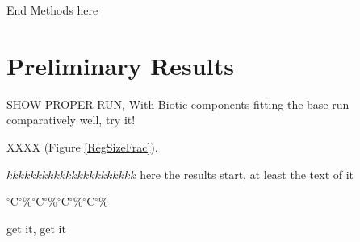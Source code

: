 End Methods here

\section{Preliminary Results}


SHOW PROPER RUN, With Biotic components fitting the base run comparatively well, try it!

XXXX (Figure \ref{RegSizeFrac}).



$kkkkkkkkkkkkkkkkkkkkkk$ here the results start, at least the text of it

$^{\circ}$C$^{\circ}$\%$^{\circ}$C$^{\circ}$\%$^{\circ}$C$^{\circ}$\%$^{\circ}$C$^{\circ}$\%


get it, get it



